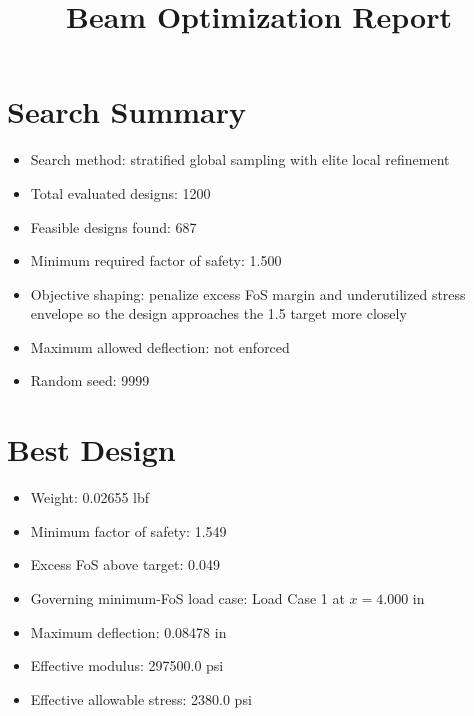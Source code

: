 \documentclass[11pt]{article}
\title{Beam Optimization Report}
\date{}
\begin{document}
\maketitle

\section*{Search Summary}
\begin{itemize}
\item Search method: stratified global sampling with elite local refinement
\item Total evaluated designs: 1200
\item Feasible designs found: 687
\item Minimum required factor of safety: 1.500
\item Objective shaping: penalize excess FoS margin and underutilized stress envelope so the design approaches the 1.5 target more closely
\item Maximum allowed deflection: not enforced
\item Random seed: 9999
\end{itemize}

\section*{Best Design}
\begin{itemize}
\item Weight: 0.02655 lbf
\item Minimum factor of safety: 1.549
\item Excess FoS above target: 0.049
\item Governing minimum-FoS load case: Load Case 1 at $x=4.000$ in
\item Maximum deflection: 0.08478 in
\item Effective modulus: 297500.0 psi
\item Effective allowable stress: 2380.0 psi
\end{itemize}
\end{document}
